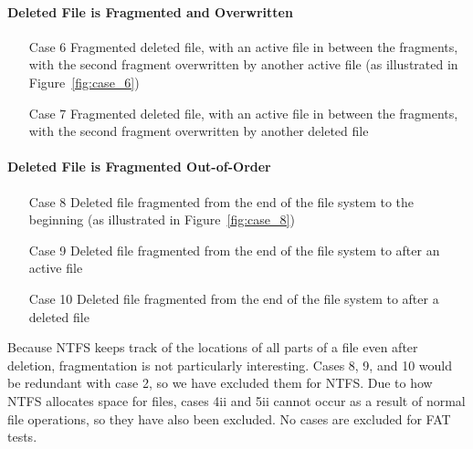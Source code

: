 \documentclass{ws-rv9x6}
\newenvironment{paraphrase}{\color{blue}}{\color{black}} %
\begin{document}
\begin{paraphrase}
\paragraph{Deleted File is Fragmented and Overwritten}
 \begin{itemize}%
    \item [Case 6] Fragmented deleted file, with an active file in between the fragments, with the second fragment overwritten by another active file (as illustrated in Figure~\ref{fig:case_6})
    \item [Case 7] Fragmented deleted file, with an active file in between the fragments, with the second fragment overwritten by another deleted file
 \end{itemize}
\paragraph{Deleted File is Fragmented Out-of-Order}
\begin{itemize}%
    \item [Case 8] Deleted file fragmented from the end of the file system to the beginning (as illustrated in Figure~\ref{fig:case_8})
    \item [Case 9] Deleted file fragmented from the end of the file system to after an active file
    \item [Case 10] Deleted file fragmented from the end of the file system to after a deleted file
\end{itemize}

Because NTFS keeps track of the locations of all parts of a file even after deletion, fragmentation is not particularly interesting. Cases 8, 9, and 10 would be redundant with case 2, so we have excluded them for NTFS. Due to how NTFS allocates space for files, cases 4ii and 5ii cannot occur as a result of normal file operations, so they have also been excluded. No cases are excluded for FAT tests.
\end{paraphrase}
\end{document}
